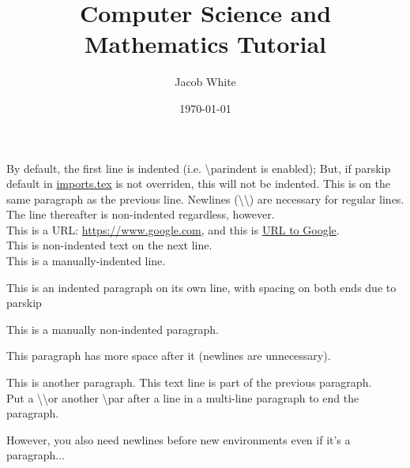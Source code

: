 \documentclass{article}
\title{Computer Science and Mathematics Tutorial}
\author{Jacob White}
\date{\today}
\begin{document}
\maketitle

By default, the first line is indented (i.e. \textbackslash{parindent} is enabled); But, if parskip default in \href{run:./imports.tex}{imports.tex} is not overriden, this will not be indented.
This is on the same paragraph as the previous line. Newlines (\textbackslash \textbackslash) are necessary for regular lines.\\
The line thereafter is non-indented regardless, however.\\
This is a URL: \url{https://www.google.com}, and this is \href{https://www.google.com}{URL to Google}.\\
This is non-indented text on the next line.\\
\indent This is a manually-indented line.
\par This is an indented paragraph on its own line, with spacing on both ends due to parskip
\par\noindent This is a manually non-indented paragraph.
\par This paragraph has more space after it (newlines are unnecessary). \\
\par This is another paragraph.
This text line is part of the previous paragraph.\\
Put a \textbackslash\textbackslash or another \textbackslash{par} after a line in a multi-line paragraph to end the paragraph. 
\par\noindent However, you also need newlines before new environments even if it's a paragraph...\\
\end{document}
